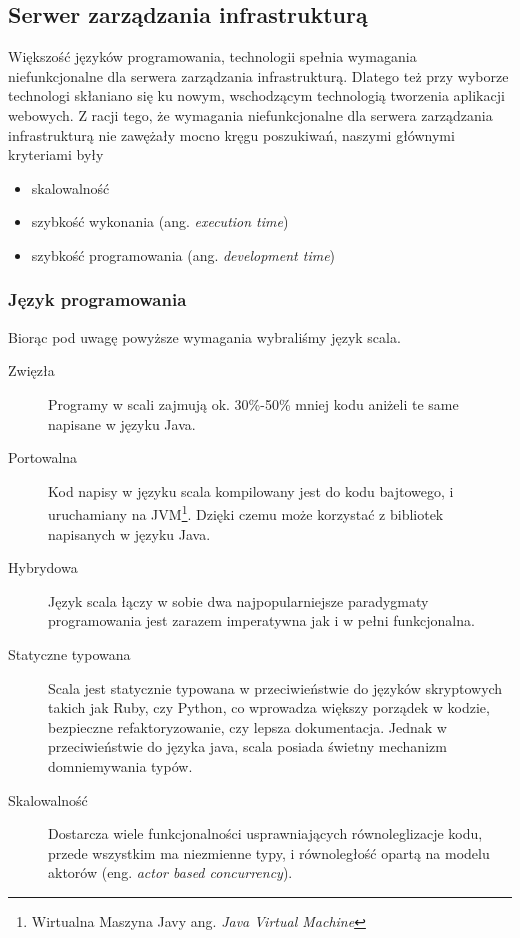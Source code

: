 \subsection{Serwer zarządzania infrastrukturą}

Większość języków programowania, technologii spełnia wymagania niefunkcjonalne dla serwera zarządzania infrastrukturą. Dlatego też przy wyborze technologi skłaniano się ku nowym, wschodzącym technologią tworzenia aplikacji webowych. Z racji tego, że wymagania niefunkcjonalne dla serwera zarządzania infrastrukturą nie zawężały mocno kręgu poszukiwań, naszymi głównymi kryteriami były

\begin{itemize}
	\item skalowalność
	\item szybkość wykonania (ang. \emph{execution time})
	\item szybkość programowania (ang. \emph{development time})
\end{itemize}

\subsubsection{Język programowania}

Biorąc pod uwagę powyższe wymagania wybraliśmy język scala.

\par

\begin{description}
	\item[Zwięzła] \hfill \par
		Programy w scali zajmują ok. 30\%-50\% mniej kodu aniżeli te same napisane w języku Java.
	\item[Portowalna] \hfill \par
		Kod napisy w języku scala kompilowany jest do kodu bajtowego, i uruchamiany na JVM\footnote{Wirtualna Maszyna Javy ang. \emph{Java Virtual Machine}}. Dzięki czemu może korzystać z bibliotek napisanych w języku Java.
	\item[Hybrydowa] \hfill \par
		Język scala łączy w sobie dwa najpopularniejsze paradygmaty programowania jest zarazem imperatywna jak i w pełni funkcjonalna.
	\item[Statyczne typowana] \hfill \par
		Scala jest statycznie typowana w przeciwieństwie do języków skryptowych takich jak Ruby, czy Python, co wprowadza większy porządek w kodzie, bezpieczne refaktoryzowanie, czy lepsza dokumentacja. Jednak w przeciwieństwie do języka java, scala posiada świetny mechanizm domniemywania typów.
	\item[Skalowalność] \hfill \par
		Dostarcza wiele funkcjonalności usprawniających równoleglizacje kodu, przede wszystkim ma niezmienne typy, i równoległość opartą na modelu aktorów (eng. \emph{actor based concurrency}).
\end{description}

